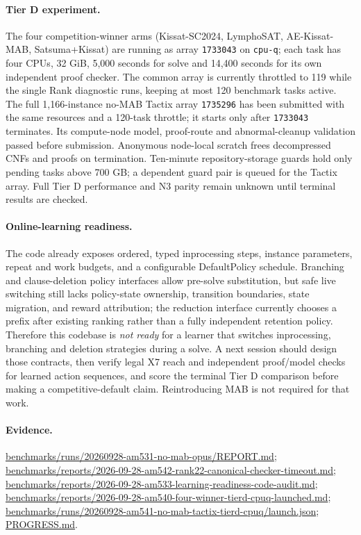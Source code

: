 \documentclass[11pt]{article}
\begin{document}
\paragraph{Tier D experiment.}
The four competition-winner arms (Kissat-SC2024, LymphoSAT, AE-Kissat-MAB, Satsuma+Kissat) are running as array \texttt{1733043} on \texttt{cpu-q}; each task has four CPUs, 32 GiB, 5,000 seconds for solve and 14,400 seconds for its own independent proof checker. The common array is currently throttled to 119 while the single Rank diagnostic runs, keeping at most 120 benchmark tasks active. The full 1,166-instance no-MAB Tactix array \texttt{1735296} has been submitted with the same resources and a 120-task throttle; it starts only after \texttt{1733043} terminates. Its compute-node model, proof-route and abnormal-cleanup validation passed before submission. Anonymous node-local scratch frees decompressed CNFs and proofs on termination. Ten-minute repository-storage guards hold only pending tasks above 700 GB; a dependent guard pair is queued for the Tactix array. Full Tier D performance and N3 parity remain unknown until terminal results are checked.

\paragraph{Online-learning readiness.}
The code already exposes ordered, typed inprocessing steps, instance parameters, repeat and work budgets, and a configurable DefaultPolicy schedule. Branching and clause-deletion policy interfaces allow pre-solve substitution, but safe live switching still lacks policy-state ownership, transition boundaries, state migration, and reward attribution; the reduction interface currently chooses a prefix after existing ranking rather than a fully independent retention policy. Therefore this codebase is \emph{not ready} for a learner that switches inprocessing, branching and deletion strategies during a solve. A next session should design those contracts, then verify legal X7 reach and independent proof/model checks for learned action sequences, and score the terminal Tier D comparison before making a competitive-default claim. Reintroducing MAB is not required for that work.

\paragraph{Evidence.}
\url{benchmarks/runs/20260928-am531-no-mab-opus/REPORT.md};
\url{benchmarks/reports/2026-09-28-am542-rank22-canonical-checker-timeout.md};
\url{benchmarks/reports/2026-09-28-am533-learning-readiness-code-audit.md};
\url{benchmarks/reports/2026-09-28-am540-four-winner-tierd-cpuq-launched.md};
\url{benchmarks/runs/20260928-am541-no-mab-tactix-tierd-cpuq/launch.json};
\url{PROGRESS.md}.
\end{document}
